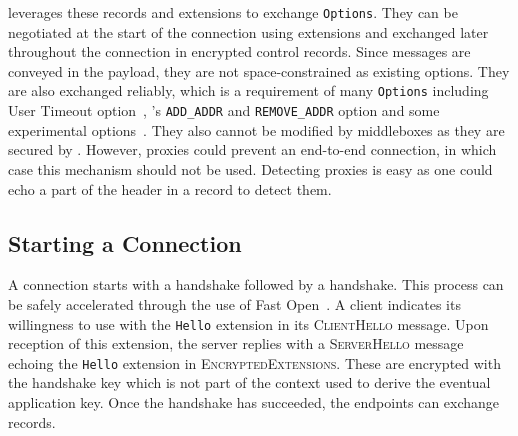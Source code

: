 \tcpls leverages these records and extensions to exchange \tcp \texttt{Options}. They can be negotiated at the start of the connection using \tls extensions and exchanged later throughout the connection in \tcpls encrypted control records. Since \tls messages are conveyed in the \tcp payload, they are not space-constrained as existing \tcp options.
They are also exchanged reliably, which is a requirement of many \tcp \texttt{Options} including \tcp User Timeout option~\cite{rfc5482}, \mptcp's \texttt{ADD\_ADDR} and \texttt{REMOVE\_ADDR} option and some experimental \tcp options~\cite{rfc6994}. They also cannot be modified by middleboxes as they are secured by \tls. However, \tcp proxies could prevent an end-to-end \tcp connection, in which case this mechanism should not be used. Detecting \tcp proxies is easy as one could echo a part of the \tcp header in a \tcpls record to detect them.



\subsection{Starting a \tcpls Connection}\label{design.start}

A \tcpls connection starts with a \tcp handshake followed by a \tls handshake.
This process can be safely accelerated through the use of \tcp Fast Open~\cite{rfc7413}.
A \tcpls client
indicates its willingness to use \tcpls with the \tcpls \texttt{Hello} extension
in its \tls \textsc{ClientHello} message. Upon reception of this extension, the \tcpls server replies with a \tls \textsc{ServerHello} message echoing the \tcpls \texttt{Hello} extension in \tls \textsc{EncryptedExtensions}.
These are encrypted with the handshake key which is not part of the context used to derive the eventual application key.
Once the \tls handshake has succeeded, the endpoints can exchange \tcpls
records.

